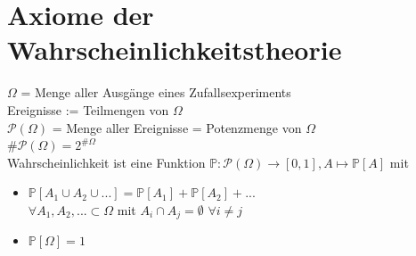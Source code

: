 \chapter{Axiome der Wahrscheinlichkeitstheorie}
$\Omega$ = Menge aller Ausgänge eines Zufallsexperiments\medskip\\
Ereignisse := Teilmengen von $\Omega$\medskip\\
$\mathcal{P}(\Omega)$ = Menge aller Ereignisse = Potenzmenge von $\Omega$\\ $\#\mathcal{P}(\Omega)=2^{\#\Omega}$\medskip\\
Wahrscheinlichkeit ist eine Funktion $\mathds{P}:\mathcal{P}(\Omega) \rightarrow [0,1], A \mapsto \mathds{P}[A] $ mit 
\begin{itemize}
	\item $\mathds{P}[A_1\cup A_2\cup...]=\mathds{P}[A_1]+\mathds{P}[A_2]+...$\\
	$\forall A_1, A_2,... \subset \Omega $ mit $A_i \cap A_j = \emptyset$ $\forall i \neq j$
	\item $\mathds{P}[\Omega]=1$
\end{itemize}
